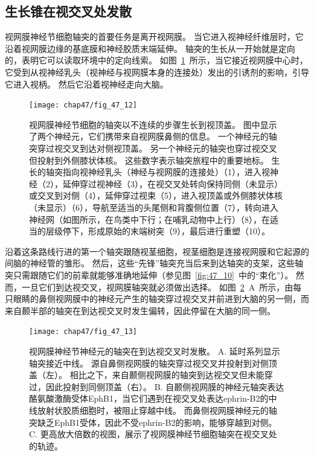 \subsection{生长锥在视交叉处发散}

视网膜神经节细胞轴突的首要任务是离开视网膜。
当它进入视神经纤维层时，它沿着视网膜边缘的基底膜和神经胶质末端延伸。
轴突的生长从一开始就是定向的，表明它可以读取环境中的定向线索。
如图~\ref{fig:47_12}~所示，当它接近视网膜中心时，它受到从视神经乳头（视神经与视网膜本身的连接处）发出的引诱剂的影响，引导它进入视柄。
然后它沿着视神经走向大脑。


\begin{figure}[htbp]
	\centering
	\texttt{[image: chap47/fig\_47\_12]}
	\caption{视网膜神经节细胞的轴突以不连续的步骤生长到视顶盖。
		图中显示了两个神经元，它们携带来自视网膜鼻侧的信息。
		一个神经元的轴突穿过视交叉到达对侧视顶盖。
		另一个神经元的轴突也穿过视交叉但投射到外侧膝状体核。
		这些数字表示轴突旅程中的重要地标。
		生长的轴突指向视神经乳头（神经与视网膜的连接处）（1），进入视神经（2），延伸穿过视神经（3），在视交叉处转向保持同侧（未显示）或交叉到对侧（4），延伸穿过视束（5），进入视顶盖或外侧膝状体核（未显示）（6），导航至适当的头尾侧和背腹侧位置（7），转向进入神经网（如图所示，在鸟类中下行；在哺乳动物中上行）（8），在适当的层级停下，形成原始的末端树突（9），最后进行重塑（10）。}
	\label{fig:47_12}
\end{figure}


沿着这条路线行进的第一个轴突跟随视茎细胞，视茎细胞是连接视网膜和它起源的间脑的神经管的雏形。
然后，这些“先锋”轴突充当后来到达轴突的支架，这些轴突只需跟随它们的前辈就能够准确地延伸（参见图~\ref{fig:47_10}~中的“束化”）。
然而，一旦它们到达视交叉，视网膜轴突就必须做出选择。
如图~\ref{fig:47_13}~A~所示，由每只眼睛的鼻侧视网膜中的神经元产生的轴突穿过视交叉并前进到大脑的另一侧，而来自颞半部的轴突在到达视交叉时发生偏转，因此停留在大脑的同一侧。


\begin{figure}[htbp]
	\centering
	\texttt{[image: chap47/fig\_47\_13]}
	\caption{视网膜神经节神经元的轴突在到达视交叉时发散。
		A. 延时系列显示轴突接近中线。
		源自鼻侧视网膜的轴突穿过视交叉并投射到对侧顶盖（左）。
		相比之下，来自颞侧视网膜的轴突到达视交叉但未能穿过，因此投射到同侧顶盖（右）。
		B. 自颞侧视网膜的神经元轴突表达酪氨酸激酶受体EphB1，当它们遇到在视交叉处表达ephrin-B2的中线放射状胶质细胞时，被阻止穿越中线。
		而鼻侧视网膜神经元的轴突缺乏EphB1受体，因此不受ephrin-B2的影响，能够穿越到对侧。
		C. 更高放大倍数的视图，展示了视网膜神经节细胞轴突在视交叉处的轨迹。}
	\label{fig:47_13}
\end{figure}


